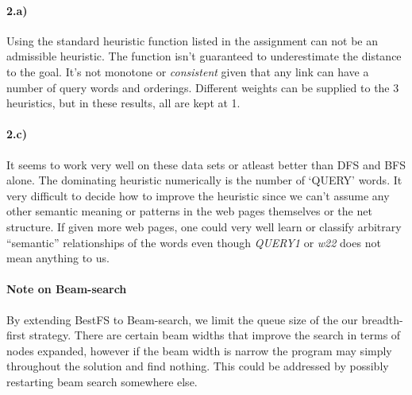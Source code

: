 \documentclass[12pt]{article}
\begin{document}
\maketitle
\paragraph{2.a)}
Using the standard heuristic function listed in the assignment can not be an admissible heuristic. The function isn't guaranteed to underestimate the distance to the goal. It's not monotone or \textit{consistent} given that any link can have a number of query words and orderings. Different weights can be supplied to the 3 heuristics, but in these results, all are kept at 1.
\paragraph{2.c)}
It seems to work very well on these data sets or atleast better than DFS and BFS alone. The dominating heuristic numerically is the number of `QUERY' words. It very difficult to decide how to improve the heuristic since we can't assume any other semantic meaning or patterns in the web pages themselves or the net structure. If given more web pages, one could very well learn or classify arbitrary ``semantic'' relationships of the words even though \textit{QUERY1} or \textit{w22} does not mean anything to us.
\paragraph{Note on Beam-search}
By extending BestFS to Beam-search, we limit the queue size of the our breadth-first strategy. There are certain beam widths that improve the search in terms of nodes expanded, however if the beam width is narrow the program may simply throughout the solution and find nothing. This could be addressed by possibly restarting beam search somewhere else.
\newpage
\end{document}

